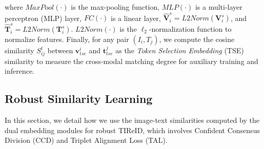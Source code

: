 \documentclass[10pt,twocolumn,letterpaper]{article}
\begin{document}
where $MaxPool(\cdot)$ is the max-pooling function, $MLP(\cdot)$ is a multi-layer perceptron (MLP) layer, $FC(\cdot)$ is a linear layer, $\hat{\boldsymbol{V}}^s_i=L2Norm({\boldsymbol{V}}^s_i)$, and $\hat{\boldsymbol{T}}^s_i=L2Norm({\boldsymbol{T}}^s_i)$. $L2Norm(\cdot)$ is the $\ell_2$-normalization function to normalize features. 
Finally, for any pair $(I_i,T_j)$, we compute the cosine similarity $S^t_{ij}$ between $\boldsymbol{v}_{tse}^i$ and $ \boldsymbol{t}_{tse}^j$ as the \emph{Token Selection Embedding} (TSE) similarity to measure the cross-modal matching degree for auxiliary training and inference.


\subsection{Robust Similarity Learning}
In this section, we detail how we use the image-text similarities computed by the dual embedding modules for robust TIReID, which involves Confident Consensus Division (CCD) and Triplet Alignment Loss (TAL). 
\end{document}
